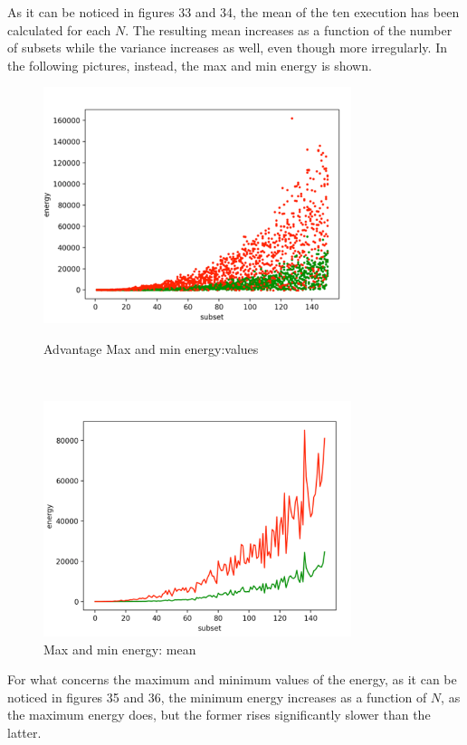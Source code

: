 \documentclass[oneside,a4paper]{article}
\begin{document}
As it can be noticed in figures 33 and 34, the mean of the ten execution has been calculated for each $N$. The resulting mean increases as a function of the number of subsets while the variance increases as well, even though more irregularly. In the following pictures, instead, the max and min energy is shown.
\newpage
\begin{figure}[htp]
\begin{minipage}[b]{9cm}
\centering
\includegraphics[width=9cm]{LaTeXTemplate/Images/MaxMinAdvValues.png}
\caption{Advantage Max and min energy:values}
\end{minipage}
\ \hspace{2mm} \hspace{2mm} \
\begin{minipage}[b]{9cm}
\centering
\includegraphics[width=9cm]{LaTeXTemplate/Images/MaxMinAdvMean.png}
\caption{Max and min energy: mean}
\end{minipage}
\end{figure}

For what concerns the maximum and minimum values of the energy, as it can be noticed in figures 35 and 36, the minimum energy increases as a function of $N$, as the maximum energy does, but the former rises significantly slower than the latter.
\end{document}
